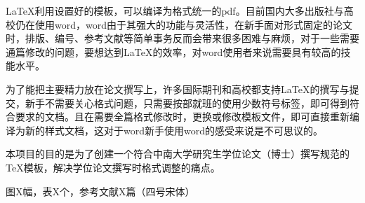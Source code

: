 \begin{abstractcn}
LaTeX利用设置好的模板，可以编译为格式统一的pdf。目前国内大多出版社与高校仍在使用word，word由于其强大的功能与灵活性，在新手面对形式固定的论文时，排版、编号、参考文献等简单事务反而会带来很多困难与麻烦，对于一些需要通篇修改的问题，要想达到LaTeX的效率，对word使用者来说需要具有较高的技能水平。

为了能把主要精力放在论文撰写上，许多国际期刊和高校都支持LaTeX的撰写与提交，新手不需要关心格式问题，只需要按部就班的使用少数符号标签，即可得到符合要求的文档。且在需要全篇格式修改时，更换或修改模板文件，即可直接重新编译为新的样式文档，这对于word新手使用word的感受来说是不可思议的。

本项目的目的是为了创建一个符合中南大学研究生学位论文（博士）撰写规范的TeX模板，解决学位论文撰写时格式调整的痛点。


\noindent 图X幅，表X个，参考文献X篇（四号宋体）

\end{abstractcn}